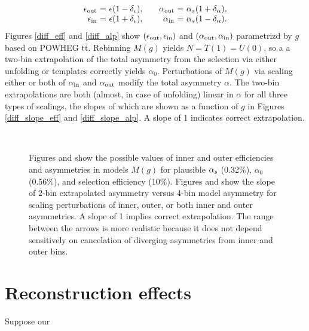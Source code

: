 \documentclass[letterpaper,11pt]{article}
\newcommand{\selected}{{\ensuremath s}}
\newcommand{\tot}{0}
\begin{document}
\[
\begin{array}{r@{\ =\ }l@{,\qquad}r@{\ =\ }l}
  \epsilon_\outr & \epsilon(1 - \depsilon) & \alpha_\outr & \alpha_\selected(1 + \dalpha),\\
  \epsilon_\innr & \epsilon(1+ \depsilon)  & \alpha_\innr & \alpha_\selected(1 - \dalpha).
\end{array}
\]
Figures \ref{diff_eff} and \ref{diff_alp} show
$(\epsilon_{\mathrm{out}},\epsilon_{\mathrm{in}})$ and $(\alpha_{\mathrm{out}},\alpha_{\mathrm{in}})$
parametrizd by $g$ based on POWHEG $\mathrm{t\bar{t}}$. Rebinning
$M(g)$ yields $N=T(1)=U(0)$, so a a two-bin extrapolation of the total
asymmetry from the selection via either unfolding or templates
correctly yields $\alpha_\tot$.  Perturbations of $M(g)$ via scaling
either or both of $\alpha_{\mathrm{in}}$ and $\alpha_{\mathrm{out}}$ modify the total
asymmetry $\alpha$.  The two-bin extrapolations are both (almost, in
case of unfolding) linear in $\alpha$ for all three types of scalings,
the slopes of which are shown as a function of $g$ in Figures
\ref{diff_slope_eff} and \ref{diff_slope_alp}.  A slope of 1 indicates
correct extrapolation.
\begin{figure}
  \centering
  \\
  \caption{\label{differential} Figures \protect{} and
    \protect{} show the possible values of inner and
    outer efficiencies and asymmetries in models $M(g)$ for plausible
    $\alpha_\selected$ (0.32\%), $\alpha_\tot$ (0.56\%), and selection
    efficiency (10\%).  Figures \protect{} and
    \protect{} show the slope of 2-bin
    extrapolated asymmetry versus 4-bin model asymmetry for scaling
    perturbations of inner, outer, or both inner and outer
    asymmetries.  A slope of 1 implies correct extrapolation.  The
    range between the arrows is more realistic because it does not
    depend sensitively on cancelation of diverging asymmetries from
    inner and outer bins.}
\end{figure}


\section{Reconstruction effects}

Suppose our 
\end{document}
